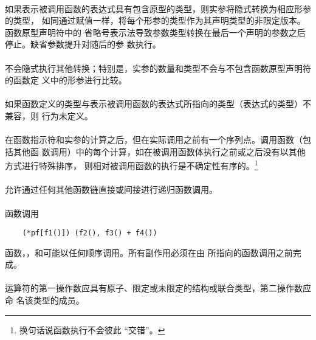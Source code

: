 \paragraph{}
如果表示被调用函数的表达式具有包含原型的类型，则实参将隐式转换为相应形参的类型，
如同通过赋值一样，将每个形参的类型作为其声明类型的非限定版本。函数原型声明符中的
省略号表示法导致参数类型转换在最后一个声明的参数之后停止。缺省参数提升对随后的参
数执行。

\paragraph{}
不会隐式执行其他转换；特别是，实参的数量和类型不会与不包含函数原型声明符的函数定
义中的形参进行比较。

\paragraph{}
如果函数定义的类型与表示被调用函数的表达式所指向的类型（表达式的类型）不兼容，则
行为未定义。

\paragraph{}
在函数指示符和实参的计算之后，但在实际调用之前有一个序列点。调用函数（包括其他函
数调用）中的每个计算，如在被调用函数体执行之前或之后没有以其他方式进行特殊排序，
则相对被调用函数的执行是不确定性有序的。\footnote{换句话说函数执行不会彼此
``交错''。}

\paragraph{}
允许通过任何其他函数链直接或间接进行递归函数调用。

\paragraph{}
\ex* 函数调用
\begin{lstlisting}
    (*pf[f1()]) (f2(), f3() + f4())
\end{lstlisting}
函数，，和可能以任何顺序调用。所有副作用必须在由
所指向的函数调用之前完成。


\constraint
\paragraph{}
运算符的第一操作数应具有原子、限定或未限定的结构或联合类型，第二操作数应命
名该类型的成员。

